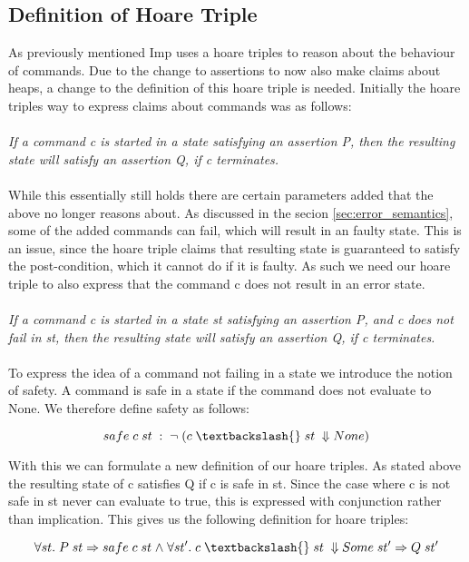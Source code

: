 \subsection{Definition of Hoare Triple}
\label{sec:hoare_triple}
As previously mentioned Imp uses a hoare triples to reason about the behaviour of commands. Due to the change to assertions to now also make claims about heaps, a change to the definition of this hoare triple is needed. Initially the hoare triples way to express claims about commands was as follows:
\\
\\
\textit{If a command c is started in a state satisfying an assertion P, then the resulting state will satisfy an assertion Q, if c terminates.}
\\
\\
While this essentially still holds there are certain parameters added that the above no longer reasons about. As discussed in the secion \ref{sec:error_semantics}, some of the added commands can fail, which will result in an faulty state. This is an issue, since the hoare triple claims that resulting state is guaranteed to satisfy the post-condition, which it cannot do if it is faulty. As such we need our hoare triple to also express that the command c does not result in an error state.
\\
\\
\textit{If a command c is started in a state st satisfying an assertion P, and c does not fail in st, then the resulting state will satisfy an assertion Q, if c terminates.}
\\
\\

To express the idea of a command not failing in a state we introduce the notion of safety. A command is safe in a state if the command does not evaluate to None. We therefore define safety as follows:

\[safe\;c\;st\;: \;\neg \;(c \;\textbackslash{}\;st\;\Downarrow None)\]

With this we can formulate a new definition of our hoare triples. As stated above the resulting state of c satisfies Q if c is safe in st. Since the case where c is not safe in st never can evaluate to true, this is expressed with conjunction rather than implication. This gives us the following definition for hoare triples:

\[
\forall st.\; P\;st \impl safe\;c\;st \land \forall st'. \;c\;\textbackslash{}\;st\;\Downarrow Some\; st' \impl Q\;st'
\]	